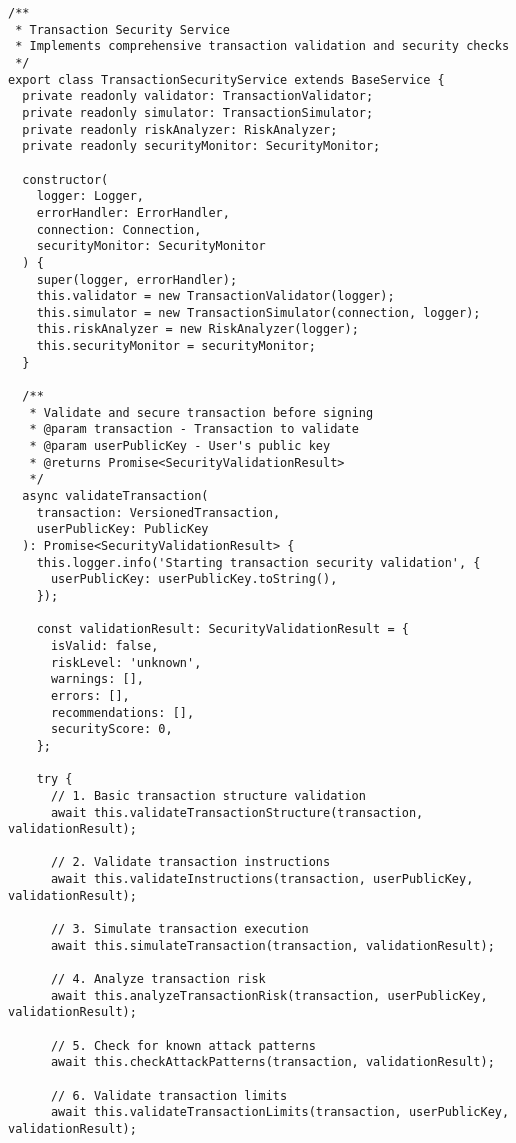 \documentclass[11pt,a4paper]{article}
\begin{document}
\begin{lstlisting}[style=typescript, caption=Comprehensive Transaction Security]
/**
 * Transaction Security Service
 * Implements comprehensive transaction validation and security checks
 */
export class TransactionSecurityService extends BaseService {
  private readonly validator: TransactionValidator;
  private readonly simulator: TransactionSimulator;
  private readonly riskAnalyzer: RiskAnalyzer;
  private readonly securityMonitor: SecurityMonitor;

  constructor(
    logger: Logger,
    errorHandler: ErrorHandler,
    connection: Connection,
    securityMonitor: SecurityMonitor
  ) {
    super(logger, errorHandler);
    this.validator = new TransactionValidator(logger);
    this.simulator = new TransactionSimulator(connection, logger);
    this.riskAnalyzer = new RiskAnalyzer(logger);
    this.securityMonitor = securityMonitor;
  }

  /**
   * Validate and secure transaction before signing
   * @param transaction - Transaction to validate
   * @param userPublicKey - User's public key
   * @returns Promise<SecurityValidationResult>
   */
  async validateTransaction(
    transaction: VersionedTransaction,
    userPublicKey: PublicKey
  ): Promise<SecurityValidationResult> {
    this.logger.info('Starting transaction security validation', {
      userPublicKey: userPublicKey.toString(),
    });

    const validationResult: SecurityValidationResult = {
      isValid: false,
      riskLevel: 'unknown',
      warnings: [],
      errors: [],
      recommendations: [],
      securityScore: 0,
    };

    try {
      // 1. Basic transaction structure validation
      await this.validateTransactionStructure(transaction, validationResult);

      // 2. Validate transaction instructions
      await this.validateInstructions(transaction, userPublicKey, validationResult);

      // 3. Simulate transaction execution
      await this.simulateTransaction(transaction, validationResult);

      // 4. Analyze transaction risk
      await this.analyzeTransactionRisk(transaction, userPublicKey, validationResult);

      // 5. Check for known attack patterns
      await this.checkAttackPatterns(transaction, validationResult);

      // 6. Validate transaction limits
      await this.validateTransactionLimits(transaction, userPublicKey, validationResult);


\end{lstlisting}
\end{document}
